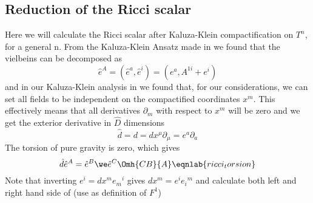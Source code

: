 \subsection{Reduction of the Ricci scalar}
Here we will calculate the Ricci scalar after Kaluza-Klein compactification on $T^n$, for a general n.
%
From the Kaluza-Klein Ansatz made in  we found that the vielbeins can be decomposed  as 
\begin{equation}
{\hat e}^A = (\hat e^a,\hat e^i) = (e^a,A^{1i} + e^i)
\end{equation}
and in our Kaluza-Klein analysis in  we found that, for our considerations, we can set all fields to be independent on the compactified coordinates $x^m$.
This effectively means that all derivatives $\partial_m$ with respect to $x^m$ will be zero and we get the exterior derivative in $\hat D$ dimensions  
\begin{equation}
\hat d = d = dx^\mu\partial_\mu = e^a\partial_a 
\end{equation}
%
The torsion  of pure gravity is zero, which gives
\begin{equation}
\hat d \hat e^A = \hat e^B\we \hat e^C \Omh{CB}{A}
\eqnlab{ricci_torsion}
\end{equation}
Note that inverting $e^i = dx^me{_m}^i$ gives $dx^m = e^i e{_i}^m$ 
and calculate both left and right hand side of  (use  as definition of $F^1$)
